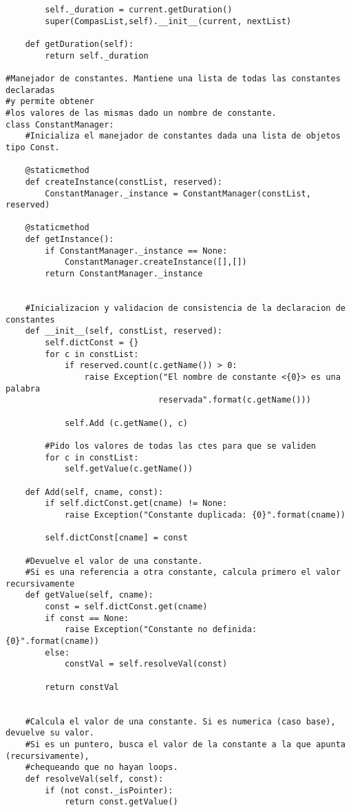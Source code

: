\begin{verbatim}
        self._duration = current.getDuration()
        super(CompasList,self).__init__(current, nextList)

    def getDuration(self):
        return self._duration

#Manejador de constantes. Mantiene una lista de todas las constantes declaradas 
#y permite obtener
#los valores de las mismas dado un nombre de constante.
class ConstantManager:
    #Inicializa el manejador de constantes dada una lista de objetos tipo Const.

    @staticmethod
    def createInstance(constList, reserved):
        ConstantManager._instance = ConstantManager(constList, reserved)

    @staticmethod
    def getInstance():
        if ConstantManager._instance == None:
            ConstantManager.createInstance([],[])
        return ConstantManager._instance


    #Inicializacion y validacion de consistencia de la declaracion de constantes
    def __init__(self, constList, reserved):
        self.dictConst = {}
        for c in constList:
            if reserved.count(c.getName()) > 0:
                raise Exception("El nombre de constante <{0}> es una palabra
                               reservada".format(c.getName()))

            self.Add (c.getName(), c)

        #Pido los valores de todas las ctes para que se validen
        for c in constList:
            self.getValue(c.getName())

    def Add(self, cname, const):
        if self.dictConst.get(cname) != None:
            raise Exception("Constante duplicada: {0}".format(cname))

        self.dictConst[cname] = const

    #Devuelve el valor de una constante. 
    #Si es una referencia a otra constante, calcula primero el valor recursivamente
    def getValue(self, cname):
        const = self.dictConst.get(cname)
        if const == None:
            raise Exception("Constante no definida: {0}".format(cname))
        else:
            constVal = self.resolveVal(const)

        return constVal


    #Calcula el valor de una constante. Si es numerica (caso base), devuelve su valor.
    #Si es un puntero, busca el valor de la constante a la que apunta (recursivamente), 
    #chequeando que no hayan loops.
    def resolveVal(self, const):
        if (not const._isPointer):
            return const.getValue()


\end{verbatim}
